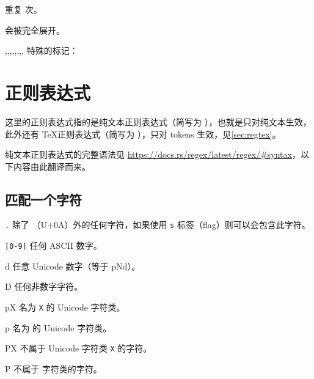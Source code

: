 \documentclass[class=article,openany]{cusdoc}[2025/10/10]
\begin{document}
\begin{function}[EXP]{\texhigh@replicate}
  \begin{syntax}
    \V{\texhigh@replicate}  
  \end{syntax}
重复   次。
\end{function}

\begin{function}{\texhigh@pdfliteral}
  \begin{syntax}
    \V{\texhigh@pdfliteral} 
  \end{syntax}
 会被完全展开。
\end{function}

\begin{function}{\THmB,\THmC,\THmD,\THmH,\THmN,\THmP,\THmR,\THmS,\THmT}
特殊的标记：
\end{function}

\section{正则表达式}\label{sec:regex}

这里的正则表达式指的是纯文本正则表达式（简写为 ），也就是只对纯文本生效，此外还有 \TeX 正则表达式（简写为 ），只对 tokens 生效，见\cref{sec:regtex}。

纯文本正则表达式的完整语法见 \url{https://docs.rs/regex/latest/regex/#syntax}，以下内容由此翻译而来。

\subsection{匹配一个字符}

\begin{regexsyntax}
  \item[\texttt{.}] 除了 （U+0A）外的任何字符，如果使用 \texttt{s} 标签（flag）则可以会包含此字符。
  \item[\texttt{[0-9]}] 任何 ASCII 数字。
  \item[\escape d] 任意 Unicode 数字（等于 \escape p{Nd}）。
  \item[\escape D] 任何非数字字符。
  \item[\escape pX] 名为 \texttt{X} 的 Unicode 字符类。
  \item[\escape p{\meta{class}}] 名为  的 Unicode 字符类。
  \item[\escape PX] 不属于 Unicode 字符类 \texttt{X} 的字符。
  \item[\escape P{\meta{class}}] 不属于  字符类的字符。
\end{regexsyntax}
\end{document}
